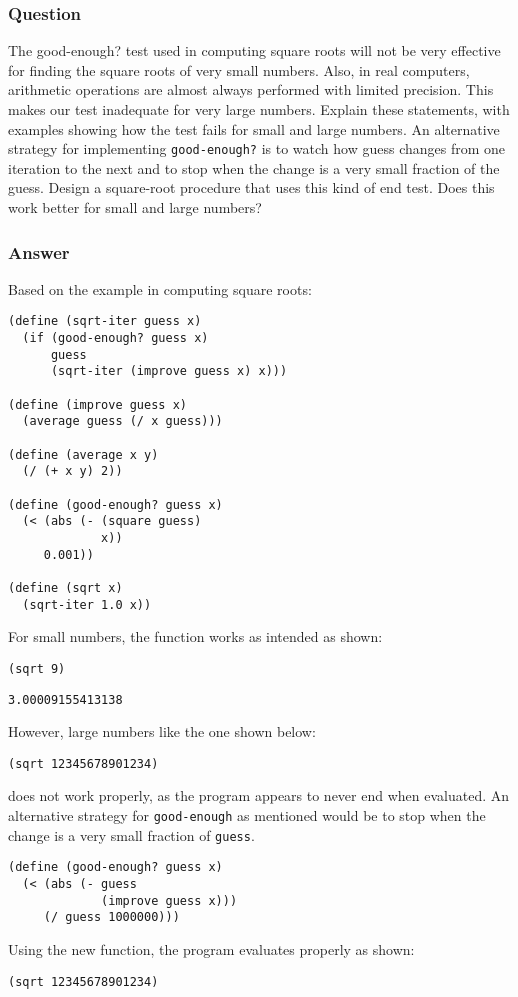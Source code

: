 \documentclass[11pt]{article}
\begin{document}
\subsubsection{Question}
\label{sec:org3d211e2}
The good-enough? test used in computing
square roots will not be very effective for finding the square
roots of very small numbers. Also, in real computers,
arithmetic operations are almost always performed with limited precision.
This makes our test inadequate for very large
numbers. Explain these statements, with examples showing
how the test fails for small and large numbers. An alternative
strategy for implementing \texttt{good-enough?} is to watch
how guess changes from one iteration to the next and to
stop when the change is a very small fraction of the guess.
Design a square-root procedure that uses this kind of end
test. Does this work better for small and large numbers?

\subsubsection{Answer}
\label{sec:org896f877}
Based on the example in computing square roots:
\begin{verbatim}
(define (sqrt-iter guess x)
  (if (good-enough? guess x)
      guess
      (sqrt-iter (improve guess x) x)))

(define (improve guess x)
  (average guess (/ x guess)))

(define (average x y)
  (/ (+ x y) 2))

(define (good-enough? guess x)
  (< (abs (- (square guess)
             x))
     0.001))

(define (sqrt x)
  (sqrt-iter 1.0 x))
\end{verbatim}
For small numbers, the function works as intended as shown:
\begin{verbatim}
(sqrt 9)
\end{verbatim}

\begin{verbatim}
3.00009155413138
\end{verbatim}

However, large numbers like the one shown below:
\begin{verbatim}
(sqrt 12345678901234)
\end{verbatim}
does not work properly, as the program appears to never end when evaluated.
An alternative strategy for \texttt{good-enough} as mentioned would be to stop when the change is a very small fraction of \texttt{guess}.
\begin{verbatim}
(define (good-enough? guess x)
  (< (abs (- guess
             (improve guess x)))
     (/ guess 1000000)))
\end{verbatim}
Using the new function, the program evaluates properly as shown:
\begin{verbatim}
(sqrt 12345678901234)
\end{verbatim}
\end{document}
